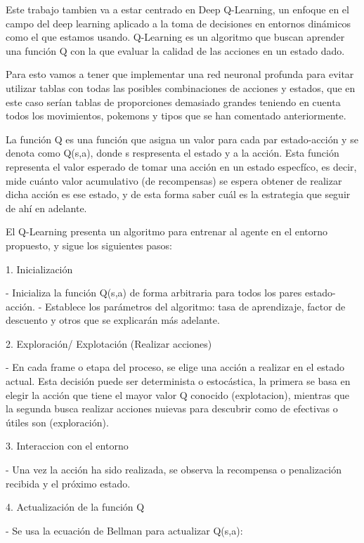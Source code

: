 Este trabajo tambien va a estar centrado en Deep Q-Learning, un enfoque en el campo del deep learning aplicado a la toma de decisiones en entornos dinámicos como el que estamos usando. Q-Learning es un algoritmo que buscan aprender una función Q con la que evaluar la calidad de las acciones en un estado dado.

Para esto vamos a tener que implementar una red neuronal profunda para evitar utilizar tablas con todas las posibles combinaciones de acciones y estados, que en este caso serían tablas de proporciones demasiado grandes teniendo en cuenta todos los movimientos, pokemons y tipos que se han comentado anteriormente. 

La función Q es una función que asigna un valor para cada par estado-acción y se denota como Q(s,a), donde s respresenta el estado y a la acción. Esta función representa el valor esperado de tomar una acción en un estado especfíco, es decir, mide cuánto valor acumulativo (de recompensas) se espera obtener de realizar dicha acción es ese estado, y de esta forma saber cuál es la estrategia que seguir de ahí en adelante.

El Q-Learning presenta un algoritmo para entrenar al agente en el entorno propuesto, y sigue los siguientes pasos:

1. Inicialización

	- Inicializa la función Q(s,a) de forma arbitraria para todos los pares estado-	acción.\newline
	- Establece los parámetros del algoritmo: tasa de aprendizaje, factor de descuento y 	otros que se explicarán más adelante.\newline


2. Exploración/ Explotación (Realizar acciones)

	- En cada frame o etapa del proceso, se elige una acción a realizar en el estado 	actual. Esta decisión puede ser determinista o estocástica, la primera se basa en 	elegir la acción que tiene el mayor valor Q conocido (explotacion), mientras que la 	segunda busca realizar acciones nuievas para descubrir como de efectivas o útiles son 	(exploración).


3. Interaccion con el entorno

	- Una vez la acción ha sido realizada, se observa la recompensa o penalización 	recibida y el próximo estado.


4. Actualización de la función Q

	- Se usa la ecuación de Bellman para actualizar Q(s,a):
		
